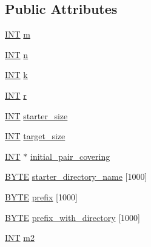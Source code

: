 \subsection*{Public Attributes}
\begin{DoxyCompactItemize}
\item 
\mbox{\hyperlink{galois_8h_a09fddde158a3a20bd2dcadb609de11dc}{I\+NT}} \mbox{\hyperlink{classregular__ls__generator_a3c48789f544f1a5c2de8e1e0a0abc22f}{m}}
\item 
\mbox{\hyperlink{galois_8h_a09fddde158a3a20bd2dcadb609de11dc}{I\+NT}} \mbox{\hyperlink{classregular__ls__generator_ab917fedcd5646499e352e02712210f44}{n}}
\item 
\mbox{\hyperlink{galois_8h_a09fddde158a3a20bd2dcadb609de11dc}{I\+NT}} \mbox{\hyperlink{classregular__ls__generator_a86b0d1fc1f6c60c928a0c2af210ffc4e}{k}}
\item 
\mbox{\hyperlink{galois_8h_a09fddde158a3a20bd2dcadb609de11dc}{I\+NT}} \mbox{\hyperlink{classregular__ls__generator_ae2db262dc99c80039fb31a76b6d44525}{r}}
\item 
\mbox{\hyperlink{galois_8h_a09fddde158a3a20bd2dcadb609de11dc}{I\+NT}} \mbox{\hyperlink{classregular__ls__generator_af90ca8c8cc46427e1cae8c44f967c847}{starter\+\_\+size}}
\item 
\mbox{\hyperlink{galois_8h_a09fddde158a3a20bd2dcadb609de11dc}{I\+NT}} \mbox{\hyperlink{classregular__ls__generator_a7cf78c612a26e7a4f5b4e917ecf56fee}{target\+\_\+size}}
\item 
\mbox{\hyperlink{galois_8h_a09fddde158a3a20bd2dcadb609de11dc}{I\+NT}} $\ast$ \mbox{\hyperlink{classregular__ls__generator_a1a66af9866cdef7579e1db0a12e8c417}{initial\+\_\+pair\+\_\+covering}}
\item 
\mbox{\hyperlink{galois_8h_ab6cc7b4aeb6ea31aba2b3fbfc83ff5e6}{B\+Y\+TE}} \mbox{\hyperlink{classregular__ls__generator_a1b07c4dc09e1d7ae0e62c651688360d0}{starter\+\_\+directory\+\_\+name}} \mbox{[}1000\mbox{]}
\item 
\mbox{\hyperlink{galois_8h_ab6cc7b4aeb6ea31aba2b3fbfc83ff5e6}{B\+Y\+TE}} \mbox{\hyperlink{classregular__ls__generator_a7137b520941e40395a636ae443a1159b}{prefix}} \mbox{[}1000\mbox{]}
\item 
\mbox{\hyperlink{galois_8h_ab6cc7b4aeb6ea31aba2b3fbfc83ff5e6}{B\+Y\+TE}} \mbox{\hyperlink{classregular__ls__generator_a85d008e8d42228cf5f12f2519d1a7568}{prefix\+\_\+with\+\_\+directory}} \mbox{[}1000\mbox{]}
\item 
\mbox{\hyperlink{galois_8h_a09fddde158a3a20bd2dcadb609de11dc}{I\+NT}} \mbox{\hyperlink{classregular__ls__generator_ae308504e1c0c7b87b1455ce767a2ae00}{m2}}

\end{DoxyCompactItemize}
